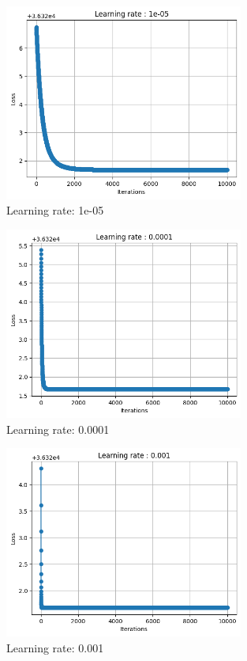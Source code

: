 \documentclass[12pt]{article}
\begin{document}
\begin{figure}[h!]
    \centering
    \includegraphics[width=0.7\textwidth]{plot_29.png}
    \caption{Learning rate: 1e-05}
    \label{fig:lr1e-05}
\end{figure}

\begin{figure}[h!]
    \centering
    \includegraphics[width=0.7\textwidth]{plot_30.png}
    \caption{Learning rate: 0.0001}
    \label{fig:lr0.0001}
\end{figure}

\begin{figure}[h!]
    \centering
    \includegraphics[width=0.7\textwidth]{plot_31.png}
    \caption{Learning rate: 0.001}
    \label{fig:lr0.001}
\end{figure}
\end{document}

